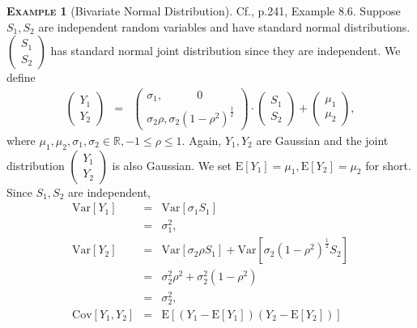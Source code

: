 \documentclass[a4paper, twoside, 11pt]{article}
\theoremstyle{definition}
\newtheorem{example}[definition]{\scshape Example}
\begin{document}
\begin{example}[Bivariate Normal Distribution]
  Cf.\cite{severini}, p.241, Example 8.6. Suppose $S_1, S_2$ are independent random variables and have standard normal distributions. $\left(
    \begin{array}{c}
      S_1 \\
      S_2
    \end{array}
  \right)$  has standard normal joint distribution since they are independent. We define
  \begin{eqnarray}
	\left(
    \begin{array}{c}
      Y_1 \\
      Y_2
    \end{array}
	\right)
	&=& 
	\left(
    \begin{array}{l}
	  \sigma_1,\hspace{3em} 0 \\
	  \sigma_2 \rho, \sigma_2(1-\rho^2)^{\frac{1}{2}}
    \end{array}
  \right) \cdot
	\left(
    \begin{array}{c}
      S_1 \\
      S_2
    \end{array}
  \right)  +
  \left(
    \begin{array}{c}
      \mu_1 \\
      \mu_2
    \end{array}
  \right)
  \label{sec:bi},
  \end{eqnarray}
  where $\mu_1, \mu_2, \sigma_1, \sigma_2 \in \mathbb{R}, -1 \le \rho \le 1$. Again, $Y_1, Y_2$ are Gaussian and the joint distribution  $\left(
    \begin{array}{c}
      Y_1 \\
      Y_2
    \end{array}
	\right)$ is also Gaussian. We set $\mathrm{E}[Y_1] = \mu_1, \mathrm{E}[Y_2] = \mu_2 $ for short. Since $S_1, S_2$ are independent,
	\begin{eqnarray*}
	  \mathrm{Var}[Y_1] &=& \mathrm{Var}[\sigma_1 S_1]\\
						 &=& \sigma_1^2 ,\\
						 \mathrm{Var}[Y_2] &=& \mathrm{Var}[\sigma_2\rho S_1] + \mathrm{Var}[\sigma_2 (1-\rho^2)^{\frac{1}{2}} S_2]\\
						 &=& \sigma_2^2 \rho^2 + \sigma_2^2(1 - \rho^2)\\
						 &=& \sigma_2^2,\\
						 \mathrm{Cov}[Y_1, Y_2] &=& \mathrm{E}[(Y_1 - \mathrm{E}[Y_1])(Y_2 - \mathrm{E}[Y_2])]\\

\end{eqnarray*}
\end{example}
\end{document}
